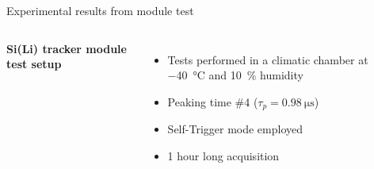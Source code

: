 \documentclass[aspectratio=169,xcolor=dvipsnames,handout]{beamer} %
\begin{document}
\begin{frame}{Experimental results from module test}
    \addtolength{\leftmargini}{\labelsep}

    \begin{columns}

            \fontsize{10pt}{1}\selectfont
            \vskip0.1cm
            \textbf{Si(Li) tracker module test setup} \\
            \vspace{0.05cm}
            
            \fontsize{8.5pt}{1}\selectfont
            \begin{itemize}
                \item Tests performed in a climatic chamber at \SI{-40}{\celsius} and \SI{10}{\percent} humidity
                \item Peaking time \#4 ($\tau_{p} = \SI{0.98}{\micro\second}$)
                \item Self-Trigger mode employed
                \item 1 hour long acquisition
            \end{itemize}
            

\end{columns}
\end{frame}
\end{document}

